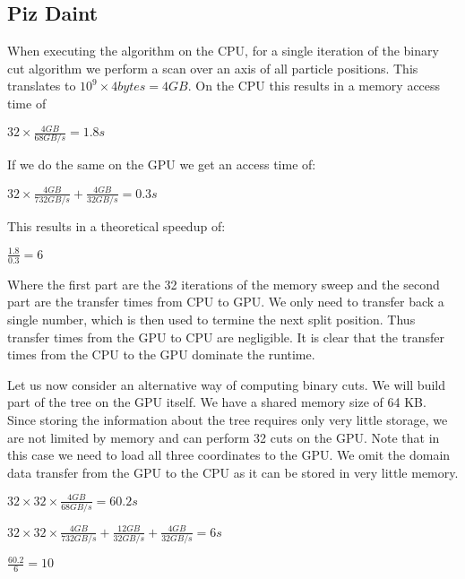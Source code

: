 \documentclass[]{article}
\begin{document}
\subsection{Piz Daint} 
When executing the algorithm on the CPU, for a single iteration of the binary cut algorithm we perform a scan over an axis of all particle positions. This translates to $10^9 \times 4 bytes = 4 GB$.
On the CPU this results in a memory access time of 
\begin{center}
	$32 \times \frac{ 4 GB}{68 GB/s} = 1.8 s$ 
\end{center}

If we do the same on the GPU we get an access time of:
\begin{center}
	$32 \times \frac{4 GB}{732 GB/s} + \frac{4 GB}{32 GB/s} = 0.3 s$ 
\end{center}

This results in a theoretical speedup of:

\begin{center}
	$\frac{1.8}{0.3} = 6$
\end{center}

Where the first part are the 32 iterations of the memory sweep and the second part are the transfer times from CPU to GPU. We only need to transfer back a single number, which is then used to termine the next split position. Thus transfer times from the GPU to CPU are negligible. It is clear that the transfer times from the CPU to the GPU dominate the runtime.

Let us now consider an alternative way of computing binary cuts. We will build part of the tree on the GPU itself. We have a shared memory size of 64 KB. Since storing the information about the tree requires only very little storage, we are not limited by memory and can perform 32 cuts on the GPU. Note that in this case we need to load all three coordinates to the GPU. We omit the domain data transfer from the GPU to the CPU as it can be stored in very little memory. 

\begin{center}
	$32 \times 32 \times \frac{ 4 GB}{68 GB/s} = 60.2 s$ 
\end{center}

\begin{center}
	$32 \times 32 \times \frac{4 GB}{732 GB/s} + \frac{12 GB}{32 GB/s} + \frac{4 GB}{32 GB/s} = 6 s$ 
\end{center}

\begin{center}
	$\frac{60.2}{6} = 10$ 
\end{center}
\end{document}
